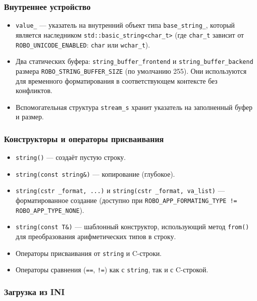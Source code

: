 \documentclass[a4paper,12pt]{article}
\begin{document}
\subsubsection{Внутреннее устройство}

\begin{itemize}
    \item \texttt{value\_} — указатель на внутренний объект типа \texttt{base\_string\_}, который является наследником \texttt{std::basic\_string<char\_t>} (где \texttt{char\_t} зависит от \texttt{ROBO\_UNICODE\_ENABLED}: \texttt{char} или \texttt{wchar\_t}).
    \item Два статических буфера: \texttt{string\_buffer\_frontend} и \texttt{string\_buffer\_backend} размера \texttt{ROBO\_STRING\_BUFFER\_SIZE} (по умолчанию 255). Они используются для временного форматирования в соответствующем контексте без конфликтов.
    \item Вспомогательная структура \texttt{stream\_s} хранит указатель на заполненный буфер и размер.
\end{itemize}

\subsubsection{Конструкторы и операторы присваивания}

\begin{itemize}
    \item \texttt{string()} — создаёт пустую строку.
    \item \texttt{string(const string\&)} — копирование (глубокое).
    \item \texttt{string(cstr \_format, ...)} и \texttt{string(cstr \_format, va\_list)} — форматированное создание (доступно при \texttt{ROBO\_APP\_FORMATING\_TYPE != ROBO\_APP\_TYPE\_NONE}).
    \item \texttt{string(const T\&)} — шаблонный конструктор, использующий метод \texttt{from()} для преобразования арифметических типов в строку.
    \item Операторы присваивания от \texttt{string} и C-строки.
    \item Операторы сравнения (\texttt{==}, \texttt{!=}) как с \texttt{string}, так и с C-строкой.
\end{itemize}

\subsubsection{Загрузка из INI}
\end{document}
